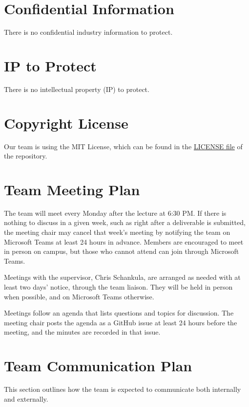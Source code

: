 \documentclass{article}
\begin{document}
\section{Confidential Information}
There is no confidential industry information to protect.


\section{IP to Protect}

There is no intellectual property (IP) to protect.

\section{Copyright License}

Our team is using the MIT License, which can be found in the \href{https://github.com/davislenover/BurnNEarn/blob/main/LICENSE}{LICENSE file} of the repository.

\section{Team Meeting Plan}

The team will meet every Monday after the lecture at 6:30 PM. If there is nothing to discuss in a given week, such as right after a deliverable is submitted, the meeting chair may cancel that week's meeting by notifying the team on Microsoft Teams at least 24 hours in advance. Members are encouraged to meet in person on campus, but those who cannot attend can join through Microsoft Teams.
\vspace{1em}


Meetings with the supervisor, Chris Schankula, are arranged as needed with at least two days' notice, through the team liaison. They will be held in person when possible, and on Microsoft Teams otherwise.
\vspace{1em}

Meetings follow an agenda that lists questions and topics for discussion. The meeting chair posts the agenda as a GitHub issue at least 24 hours before the meeting, and the minutes are recorded in that issue.

\section{Team Communication Plan}
This section outlines how the team is expected to communicate both internally and externally. \newline
\end{document}
